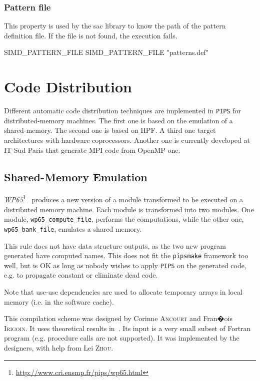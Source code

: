 \documentclass[a4paper]{report}
\newcommand{\LINK}[2]{\href{#2}{#1}\footnote{\url{#2}}\xspace}
\newcommand{\Pips}{\texttt{PIPS}}
\newcommand{\Pipsmake}{\texttt{pipsmake}}
\newcommand{\WPsc}{\LINK{\emph{WP65}}{http://www.cri.ensmp.fr/pips/wp65.html}}
\begin{document}
\subsubsection{Pattern file}

This property is used by the sac library to know the path of the pattern definition file.
If the file is not found, the execution fails.

\begin{PipsProp}{SIMD_PATTERN_FILE}
SIMD_PATTERN_FILE "patterns.def"
\end{PipsProp}


\section{Code Distribution}
\label{subsection-code-distribution}

Different automatic code distribution techniques are implemented in \Pips{} for
distributed-memory machines. The first one is based on the emulation of
a shared-memory. The second one is based on HPF. A third one target
architectures with hardware coprocessors. Another one is currently
developed at IT Sud Paris that generate MPI code from OpenMP one.

\subsection{Shared-Memory Emulation}
\label{subsubsection-shared-memory-emulation}

\WPsc{}~\cite{IA91,IA92a,IA92b} produces a new version of a module
transformed to be executed on a distributed memory machine. Each module
is transformed into two modules. One module, \texttt{wp65\_compute\_file},
performs the computations, while the other one, \texttt{wp65\_bank\_file},
emulates a shared memory.

This rule does not have data structure outputs, as the two new program
generated have computed names. This does not fit the \Pipsmake{} framework
too well, but is OK as long as nobody wishes to apply \Pips{} on the
generated code, e.g. to propagate constant or eliminate dead code.

Note that use-use dependencies are used to allocate temporary arrays in
local memory (i.e. in the software cache).

This compilation scheme was designed by Corinne \textsc{Ancourt} and Fran�ois
\textsc{Irigoin}. It uses theoretical results in~\cite{AI91}. Its input is a very
small subset of Fortran program (e.g. procedure calls are not supported).
It was implemented by the designers, with help from Lei \textsc{Zhou}.
\end{document}
